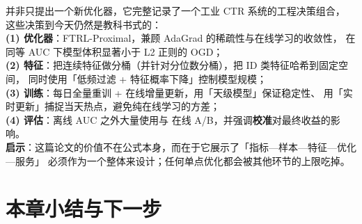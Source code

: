 \begin{casebox}
\cite{mcmahan2013ftrl} 并非只提出一个新优化器，它完整记录了一个工业 CTR 系统的工程决策组合，
这些决策到今天仍然是教科书式的：\\
\textbf{(1) 优化器}：FTRL-Proximal，兼顾 AdaGrad 的稀疏性与在线学习的收敛性，
在同等 AUC 下模型体积显著小于 L2 正则的 OGD；\\
\textbf{(2) 特征}：把连续特征做分桶（并针对分位数分桶），把 ID 类特征哈希到固定空间，
同时使用「低频过滤 + 特征概率下降」控制模型规模；\\
\textbf{(3) 训练}：每日全量重训 + 在线增量更新，用「天级模型」保证稳定性、
用「实时更新」捕捉当天热点，避免纯在线学习的方差；\\
\textbf{(4) 评估}：离线 AUC 之外大量使用与
在线 A/B，并强调\textbf{校准}对最终收益的影响。\\
\textbf{启示}：这篇论文的价值不在公式本身，而在于它展示了「指标—样本—特征—优化—服务」
必须作为一个整体来设计；任何单点优化都会被其他环节的上限吃掉。
\end{casebox}

\section{本章小结与下一步}

